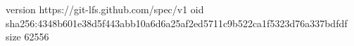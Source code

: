 version https://git-lfs.github.com/spec/v1
oid sha256:4348b601e38d5f443abb10a6d6a25af2ed5711c9b522ca1f5323d76a337bdfdf
size 62556
